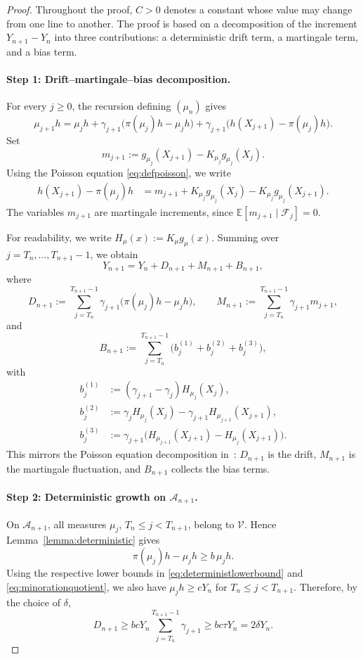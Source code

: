 \documentclass[10pt,letterpaper]{article}
\theoremstyle{compactplain}
\theoremstyle{compactdefinition}
\newcommand{\1}{\mathds{1}}
\begin{document}
\begin{proof}
Throughout the proof, \(C>0\) denotes a constant whose value may change from one line to another.
The proof is based on a decomposition of the increment \(Y_{n+1}-Y_n\) into
three contributions: a deterministic drift term, a martingale term, and a bias
term.

\paragraph{Step 1: Drift--martingale--bias decomposition.}
For every \(j\geq0\), the recursion defining \((\mu_n)\) gives
\[
\mu_{j+1}h
=
\mu_jh
+
\gamma_{j+1}\bigl(\pi(\mu_j)h-\mu_jh\bigr)
+
\gamma_{j+1}\bigl(h(X_{j+1})-\pi(\mu_j)h\bigr).
\]
Set
\[
m_{j+1}
:=
g_{\mu_j}(X_{j+1})-K_{\mu_j}g_{\mu_j}(X_j).
\]
Using the Poisson equation \eqref{eq:defpoisson}, we write
\[
\begin{aligned}
h(X_{j+1})-\pi(\mu_j)h
&=
m_{j+1}
+
K_{\mu_j}g_{\mu_j}(X_j)
-
K_{\mu_j}g_{\mu_j}(X_{j+1}).
\end{aligned}
\]
The variables \(m_{j+1}\) are martingale increments, since
\(\mathbb E[m_{j+1}\mid\mathcal F_j]=0\).

For readability, we write \(H_\mu(x):=K_\mu g_\mu(x)\). Summing over
\(j=T_n,\ldots,T_{n+1}-1\), we obtain
\[
Y_{n+1}
=
Y_n+D_{n+1}+M_{n+1}+B_{n+1},
\]
where
\[
D_{n+1}:=
\sum_{j=T_n}^{T_{n+1}-1}
\gamma_{j+1}\bigl(\pi(\mu_j)h-\mu_jh\bigr),
\qquad
M_{n+1}:=
\sum_{j=T_n}^{T_{n+1}-1}
\gamma_{j+1}m_{j+1},
\]
and
\[
B_{n+1}:=
\sum_{j=T_n}^{T_{n+1}-1}
\bigl(b_j^{(1)}+b_j^{(2)}+b_j^{(3)}\bigr),
\]
with
\[
\begin{aligned}
b_j^{(1)}
&:=
(\gamma_{j+1}-\gamma_j)H_{\mu_j}(X_j),\\
b_j^{(2)}
&:=
\gamma_jH_{\mu_j}(X_j)
-
\gamma_{j+1}H_{\mu_{j+1}}(X_{j+1}),\\
b_j^{(3)}
&:=
\gamma_{j+1}
\bigl(H_{\mu_{j+1}}(X_{j+1})-H_{\mu_j}(X_{j+1})\bigr).
\end{aligned}
\]
This mirrors the Poisson equation decomposition in~\cite[Lemma~2.4]{BC2015}: \(D_{n+1}\) is the
drift, \(M_{n+1}\) is the martingale fluctuation, and \(B_{n+1}\) collects the
bias terms.

\paragraph{Step 2: Deterministic growth on \(\mathcal A_{n+1}\).}
On \(\mathcal A_{n+1}\), all measures \(\mu_j\), \(T_n\leq j<T_{n+1}\), belong
to \(\mathcal V\). Hence Lemma~\ref{lemma:deterministic} gives
\[
\pi(\mu_j)h-\mu_jh\geq b\,\mu_jh.
\]
Using the respective lower bounds in \eqref{eq:deterministlowerbound} and \eqref{eq:minorationquotient}, we
also have \(\mu_jh\geq cY_n\) for \(T_n\leq j<T_{n+1}\). Therefore, by the
choice of \(\delta\),
\[
D_{n+1}
\geq
bcY_n\sum_{j=T_n}^{T_{n+1}-1}\gamma_{j+1}
\geq
bc\tau Y_n
=
2\delta Y_n.
\]


\end{proof}
\end{document}
